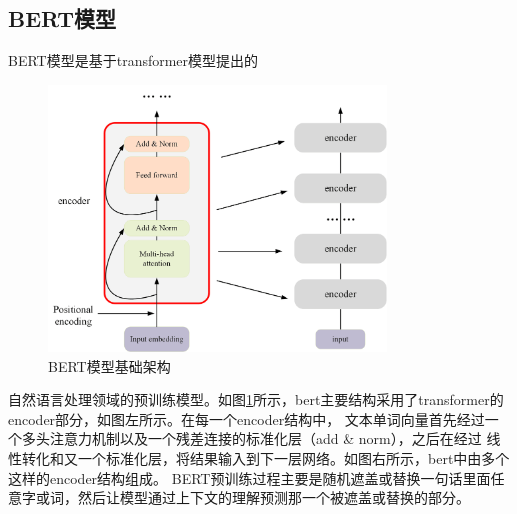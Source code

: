 \subsection{BERT模型}
BERT模型是基于transformer模型提出的
\begin{figure}[htb]%
	\setlength{\belowcaptionskip}{0pt}
	\centering
	\includegraphics[width=0.8\textwidth]{pic/2-15.png}
	\caption{BERT模型基础架构}
	\label{bert}
\end{figure}
自然语言处理领域的预训练模型。如图\ref{bert}所示，bert主要结构采用了transformer的encoder部分，如图左所示。在每一个encoder结构中，
文本单词向量首先经过一个多头注意力机制以及一个残差连接的标准化层（add \& norm），之后在经过
线性转化和又一个标准化层，将结果输入到下一层网络。如图右所示，bert中由多个这样的encoder结构组成。
BERT预训练过程主要是随机遮盖或替换一句话里面任意字或词，然后让模型通过上下文的理解预测那一个被遮盖或替换的部分。


